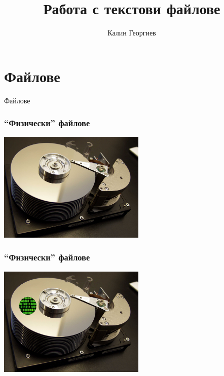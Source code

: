 \documentclass{beamer}
\begin{document}
\title[Увод в програмирането]{Работа с текстови файлове} 
\author{Калин Георгиев}
\frame{\titlepage} 


\section{Файлове}


\begin{frame}
\centerline{Файлове}
\end{frame}


\begin{frame}[fragile]
\frametitle{``Физически'' файлове}


\begin{center}
   \includegraphics[width=7cm]{images/harddisk}
\end{center}

\end{frame}

\begin{frame}[fragile]
\frametitle{``Физически'' файлове}


\begin{center}
   \includegraphics[width=7cm]{images/harddisk-oneszeros}
\end{center}

\end{frame}
\end{document}
